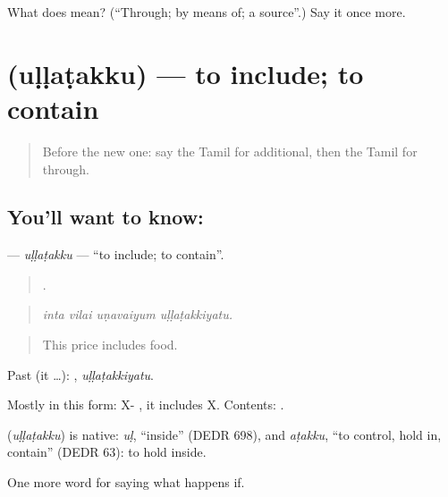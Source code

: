 \begin{tcolorbox}[breakable,colback=teal!4,colframe=teal!35!black,title={Before you move on}]
What does  mean? (\textquotedblleft{}Through; by means of; a source\textquotedblright{}.) Say it once more.
\end{tcolorbox}
\section[\texorpdfstring{\ta{உள்ளடக்கு} (uḷḷaṭakku)}{உள்ளடக்கு (uḷḷaṭakku)}]{ (uḷḷaṭakku) — to include; to contain}

\label{lesson:TA-C399-ullatakku}



\begin{quote}
Before the new one: say the Tamil for additional, then the Tamil for through.
\end{quote}

\subsection*{You'll want to know: }
\textbf{} — \emph{uḷḷaṭakku} — \textquotedblleft{}to include; to contain\textquotedblright{}.

\begin{quote}
   .
\end{quote}

\begin{quote}
\emph{inta vilai uṇavaiyum uḷḷaṭakkiyatu.}
\end{quote}

\begin{quote}
This price includes food.
\end{quote}

Past (it …): , \emph{uḷḷaṭakkiyatu}.

Mostly in this form: X- , it includes X. Contents: .

\begin{cousinweb}
\textbf{} (\emph{uḷḷaṭakku}) is native: \emph{uḷ}, \textquotedblleft{}inside\textquotedblright{} (DEDR 698), and \emph{aṭakku}, \textquotedblleft{}to control, hold in, contain\textquotedblright{} (DEDR 63): to hold inside.
\end{cousinweb}

\begin{grammarlens}[title={What you've built}]
One more word for saying what happens if.
\end{grammarlens}

